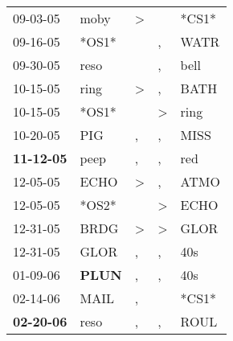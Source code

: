 \begin{supertabular}{p{0.07\textwidth}p{0.06\textwidth}p{0.02\textwidth}p{0.02\textwidth}p{0.06\textwidth}}
          09-03-05\textsuperscript{} &           moby\textsuperscript{} &     \textgreater &                  &                            *CS1* \\
          09-16-05\textsuperscript{} &                            *OS1* &                  &                , &           WATR\textsuperscript{} \\
          09-30-05\textsuperscript{} &           reso\textsuperscript{} &                  &                , &           bell\textsuperscript{} \\
          10-15-05\textsuperscript{} &           ring\textsuperscript{} &     \textgreater &                , &           BATH\textsuperscript{} \\
          10-15-05\textsuperscript{} &                            *OS1* &                  &     \textgreater &           ring\textsuperscript{} \\
          10-20-05\textsuperscript{} &            PIG\textsuperscript{} &                , &                , &           MISS\textsuperscript{} \\
 \textbf{11-12-05\textsuperscript{}} &           peep\textsuperscript{} &                , &                , &            red\textsuperscript{} \\
          12-05-05\textsuperscript{} &           ECHO\textsuperscript{} &     \textgreater &                , &           ATMO\textsuperscript{} \\
          12-05-05\textsuperscript{} &                            *OS2* &                  &     \textgreater &           ECHO\textsuperscript{} \\
          12-31-05\textsuperscript{} &           BRDG\textsuperscript{} &     \textgreater &     \textgreater &           GLOR\textsuperscript{} \\
          12-31-05\textsuperscript{} &           GLOR\textsuperscript{} &                , &                , &            40s\textsuperscript{} \\
          01-09-06\textsuperscript{} &  \textbf{PLUN\textsuperscript{}} &                , &                , &            40s\textsuperscript{} \\
          02-14-06\textsuperscript{} &           MAIL\textsuperscript{} &                , &                  &                            *CS1* \\
 \textbf{02-20-06\textsuperscript{}} &           reso\textsuperscript{} &                , &                , &           ROUL\textsuperscript{} \\

\end{supertabular}
